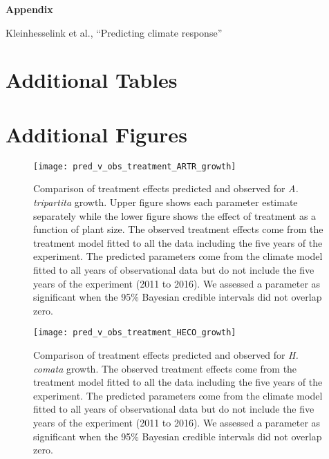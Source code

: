 \documentclass[11pt]{article}
\begin{document}
\centerline{\Large \textbf{Appendix}}
\centerline{Kleinhesselink et al., ``Predicting climate response''} 

\vspace{0.4in} 

\section{Additional Tables} \label{appendix}




\clearpage
\newpage

\section{Additional Figures} 

\begin{figure}[!htbp]
	\centering
	\texttt{[image: pred\_v\_obs\_treatment\_ARTR\_growth]}
	\caption{Comparison of treatment effects predicted and observed for \textit{A. tripartita} growth.  Upper figure shows each parameter estimate separately while the lower figure shows the effect of treatment as a function of plant size.  The observed treatment effects come from the treatment model fitted to all the data including the five years of the experiment.  The predicted parameters come from the climate model fitted to all years of observational data but do not include the five years of the experiment (2011 to 2016). We assessed a parameter as significant when the 95\% Bayesian credible intervals did not overlap zero.}
	\label{fig:parPredARTRGrowth}
\end{figure}

\begin{figure}[!htbp]
	\centering
	\texttt{[image: pred\_v\_obs\_treatment\_HECO\_growth]}
	\caption{Comparison of treatment effects predicted and observed for \textit{H. comata} growth.  The observed treatment effects come from the treatment model fitted to all the data including the five years of the experiment.  The predicted parameters come from the climate model fitted to all years of observational data but do not include the five years of the experiment (2011 to 2016). We assessed a parameter as significant when the 95\% Bayesian credible intervals did not overlap zero.}
	\label{fig:parPredHECOGrowth}
\end{figure}
\end{document}
